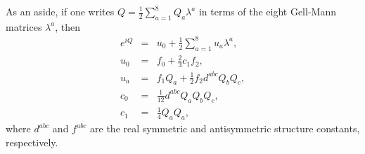 As an aside, if one writes $Q=\frac{1}{2}\sum_{a=1}^8 Q_a\lambda^a$
in terms of the eight Gell-Mann matrices $\lambda^a$, then
\begin{eqnarray}
  e^{i Q}&=&u_0+\textstyle\frac{1}{2}\sum_{a=1}^8 u_a \lambda^a,\\
  u_0 &=& f_0+\textstyle\frac{2}{3}c_1f_2,\\
  u_a &=& f_1 Q_a + \textstyle\frac{1}{2} f_2 d^{abc}Q_bQ_c,\\
  c_0 &=& \textstyle\frac{1}{12}d^{abc}Q_a Q_bQ_c,\\
  c_1 &=& \textstyle\frac{1}{4}Q_aQ_a,
\end{eqnarray}
where $d^{abc}$ and $f^{abc}$ are the real symmetric and antisymmetric
structure constants, respectively.


